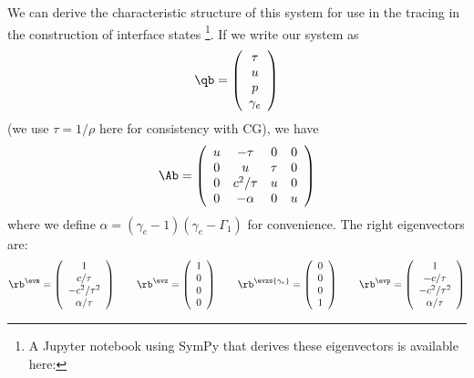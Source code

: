 We can derive the characteristic structure of this system for use
in the tracing in the construction of interface states%
\footnote{A {\sf Jupyter} notebook using {\sf SymPy} that derives these
eigenvectors is available here:
}.
If we write
our system as
\begin{equation}
\qb = \left ( \begin{array}{c} \tau \\ u \\ p \\ \gamma_e \end{array} \right )
\end{equation}
(we use $\tau = 1/\rho$ here for consistency with CG), we have
\begin{equation}
\Ab = \left ( \begin{array}{cccc} u & -\tau    & 0      & 0 \\
                                0 & u        & \tau   & 0 \\
                                0 & c^2/\tau & u      & 0 \\
                                0 & -\alpha  & 0      & u
            \end{array} \right )
\end{equation}
where we define $\alpha = (\gamma_e - 1)(\gamma_e - \Gamma_1)$ for
convenience.  The right eigenvectors are:
\begin{equation}
\rb^\evm = \left( \begin{array}{c} 1\\ {c}/{\tau}\\ -{c^{2}}/{\tau^{2}}\\ {\alpha}/{\tau}\end{array}\right)
%
\qquad
\rb^\evz = \left( \begin{array}{c} 1\\0\\0\\0 \end{array}\right)
%
\qquad
\rb^\evzs{\gamma_e} = \left( \begin{array}{c} 0\\0\\0\\1\end{array}\right)
%
\qquad
\rb^\evp = \left( \begin{array}{c} 1\\ -{c}/{\tau}\\ -{c^{2}}/{\tau^{2}}\\ {\alpha}/{\tau} \end{array}\right )
\end{equation}
